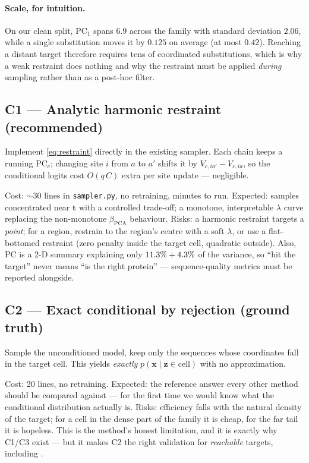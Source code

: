 \documentclass[10pt,a4paper]{article}
\newcommand{\cost}[1]{\textsf{\footnotesize #1}}
\newcommand{\PC}{\mathrm{PC}}
\newcommand{\PCA}{\mathrm{PCA}}
\begin{document}
\paragraph{Scale, for intuition.} On our clean split, $\PC_1$ spans $6.9$ across the family with
standard deviation $2.06$, while a single substitution moves it by $0.125$ on average (at most
$0.42$). Reaching a distant target therefore requires tens of coordinated substitutions, which is
why a weak restraint does nothing and why the restraint must be applied \emph{during} sampling
rather than as a post-hoc filter.

\subsection*{C1 --- Analytic harmonic restraint (recommended)}
Implement \eqref{eq:restraint} directly in the existing sampler. Each chain keeps a running
$\PC_c$; changing site $i$ from $a$ to $a'$ shifts it by $V_{c,ia'}-V_{c,ia}$, so the conditional
logits cost $O(q\,C)$ extra per site update --- negligible.

\noindent\cost{Cost:} ${\sim}30$ lines in \texttt{sampler.py}, no retraining, minutes to run.
\cost{Expected:} samples concentrated near $\bm t$ with a controlled trade-off; a monotone,
interpretable $\lambda$ curve replacing the non-monotone $\beta_{\PCA}$ behaviour.
\cost{Risks:} a harmonic restraint targets a \emph{point}; for a region, restrain to the region's
centre with a soft $\lambda$, or use a flat-bottomed restraint (zero penalty inside the target
cell, quadratic outside). Also, $\PC$ is a 2-D summary explaining only
$11.3\%+4.3\%$ of the variance, so ``hit the target'' never means ``is the right protein''
--- sequence-quality metrics must be reported alongside.

\subsection*{C2 --- Exact conditional by rejection (ground truth)}
Sample the unconditioned model, keep only the sequences whose coordinates fall in the target cell.
This yields \emph{exactly} $p(\bm x\mid \bm z\in\text{cell})$ with no approximation.

\noindent\cost{Cost:} 20 lines, no retraining. \cost{Expected:} the reference answer every other
method should be compared against --- for the first time we would know what the conditional
distribution actually is. \cost{Risks:} efficiency falls with the natural density of the target;
for a cell in the dense part of the family it is cheap, for the far tail it is hopeless. This is
the method's honest limitation, and it is exactly why C1/C3 exist --- but it makes C2 the right
validation for \emph{reachable} targets, including \MissCl.
\end{document}
